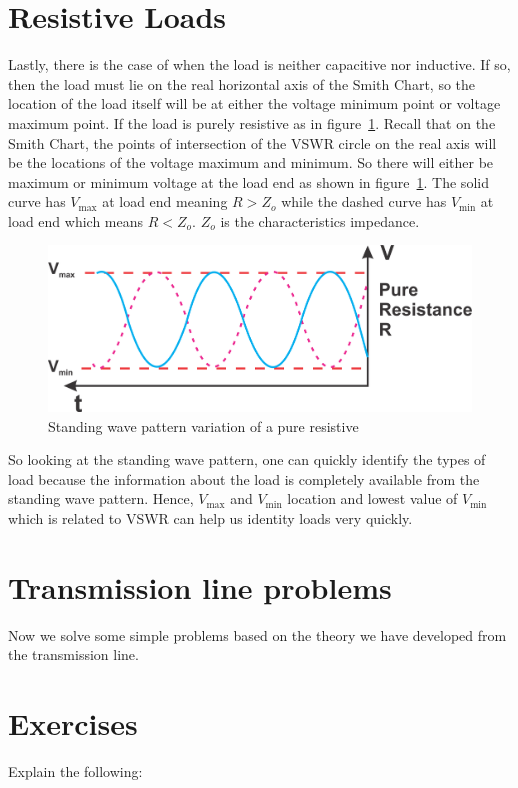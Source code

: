 \section{Resistive Loads}
Lastly, there is the case of when the load is neither capacitive nor inductive. If so, then the load must lie on the real horizontal axis of the Smith Chart, so the location of the load itself will be at either the voltage minimum point or voltage maximum point. If the load is purely resistive as in figure~\ref{fig:group95}. Recall that on the Smith Chart, the points of intersection of the VSWR circle on the real axis will be the locations of the voltage maximum and minimum. So there will either be maximum or minimum voltage at the load end as shown in figure~\ref{fig:group95}. The solid curve has ${V_\max}$ at load end meaning ${R>Z_o}$ while the dashed curve has ${V_\min}$ at load end which means ${R<Z_o}$. ${Z_o}$ is the characteristics impedance.
\begin{figure}[h]
\centering
\includegraphics[scale=0.5]{./graphics/Group95}
\caption{Standing wave pattern variation of a pure resistive}
\label{fig:group95}
\end{figure}

So looking at the standing wave pattern, one can quickly identify the types of load because the information about the load is completely available from the standing wave pattern. Hence, ${V_\max}$ and ${V_\min}$ location and lowest value of ${V_\min}$ which is related to VSWR can help us identity loads very quickly.

\section{Transmission line problems}
Now we solve some simple problems based on the theory we have developed from the transmission line.

\section*{Exercises}
\begin{ExerciseList}
\Exercise[label={ex91}]
Explain the following:
\end{ExerciseList}